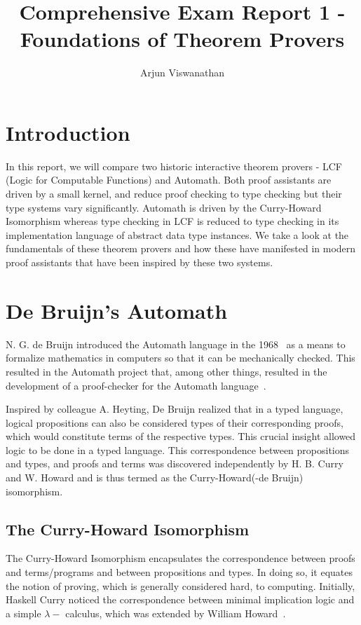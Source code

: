 \documentclass{article}
\begin{document}
\title{Comprehensive Exam Report 1 - Foundations of Theorem Provers}
\author{Arjun Viswanathan}
\date{}
\maketitle

\section{Introduction}
\label{sec:intro}
	In this report, we will compare two historic 
	interactive theorem provers - LCF (Logic for 
	Computable Functions) and Automath. Both proof 
	assistants are driven by a small kernel, and 
	reduce proof checking to type checking but 
	their type systems vary significantly. 
	Automath is driven by the Curry-Howard 
	Isomorphism whereas type checking in LCF 
	is reduced to type checking in its 
	implementation language of abstract data 
	type instances. We take a look at the 
	fundamentals of these theorem provers and how 
	these have manifested in modern proof 
	assistants that have been inspired by these 
	two systems.

\section{De Bruijn's Automath}
\label{sec:automath}
	N. G. de Bruijn introduced the Automath 
	language in the 
	1968~\cite{deBruijn1983, 10.1007/BFb0060623} 
	as a means to formalize mathematics in 
	computers so that it can be mechanically
	checked. This resulted in the Automath 
	project that, among other things, resulted
	in the development of a proof-checker 
	for the Automath language~\cite{5df50ef4ddff4ff091125a511f563319, 
	c398556a074e49a193d5035ae32aaa79}.

	Inspired by colleague A. Heyting, De Bruijn 
	realized that in a typed language, logical 
	propositions can also be considered types 
	of their corresponding proofs, which would 
	constitute terms of the respective types.
	This crucial insight allowed logic to be 
	done in a typed language. This 
	correspondence between propositions 
	and types, and proofs and terms was 
	discovered independently by H. B. Curry 
	and W. Howard and is thus termed as 
	the Curry-Howard(-de Bruijn) isomorphism.
	
	\subsection{The Curry-Howard Isomorphism}
	\label{sec:curry}
	The Curry-Howard Isomorphism encapsulates 
	the correspondence between proofs and 
	terms/programs and between propositions
	and types. In doing so, it equates the 
	notion of proving, which is generally 
	considered hard, to computing.
	Initially, Haskell Curry noticed the 
	correspondence between minimal 
	implication logic and a simple 
	$\lambda-$ calculus, which was extended
	by William 
	Howard~\cite{Howard1995-HOWTFN}.
	
\end{document}

